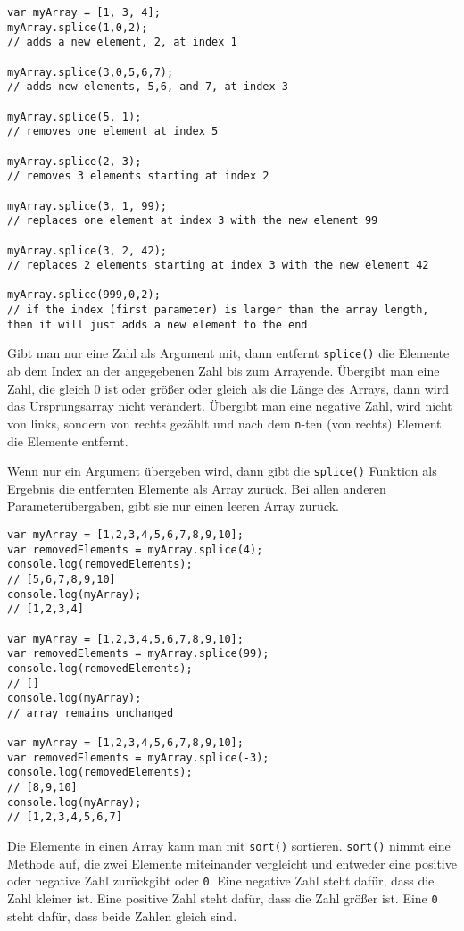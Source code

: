 \documentclass[babel]{book}
\begin{document}
\begin{lstlisting}[caption=Array Konstruktor]
var myArray = [1, 3, 4];
myArray.splice(1,0,2); 
// adds a new element, 2, at index 1

myArray.splice(3,0,5,6,7); 
// adds new elements, 5,6, and 7, at index 3

myArray.splice(5, 1); 
// removes one element at index 5

myArray.splice(2, 3); 
// removes 3 elements starting at index 2

myArray.splice(3, 1, 99); 
// replaces one element at index 3 with the new element 99

myArray.splice(3, 2, 42); 
// replaces 2 elements starting at index 3 with the new element 42

myArray.splice(999,0,2); 
// if the index (first parameter) is larger than the array length, then it will just adds a new element to the end

\end{lstlisting}

Gibt man nur eine Zahl als Argument mit, dann entfernt \lstinline|splice()| die Elemente ab dem Index an der angegebenen Zahl bis zum Arrayende. Übergibt man eine Zahl, die gleich 0 ist oder größer oder gleich als die Länge des Arrays, dann wird das Ursprungsarray nicht verändert. Übergibt man eine negative Zahl, wird nicht von links, sondern von rechts gezählt und nach dem \lstinline|n|-ten (von rechts) Element die Elemente entfernt.

Wenn nur ein Argument übergeben wird, dann gibt die \lstinline|splice()| Funktion als Ergebnis die entfernten Elemente als Array zurück. Bei allen anderen Parameterübergaben, gibt sie nur einen leeren Array zurück.

\begin{lstlisting}[caption=Array Konstruktor]
var myArray = [1,2,3,4,5,6,7,8,9,10];
var removedElements = myArray.splice(4);
console.log(removedElements);
// [5,6,7,8,9,10]
console.log(myArray);
// [1,2,3,4]

var myArray = [1,2,3,4,5,6,7,8,9,10];
var removedElements = myArray.splice(99);
console.log(removedElements);
// []
console.log(myArray);
// array remains unchanged

var myArray = [1,2,3,4,5,6,7,8,9,10];
var removedElements = myArray.splice(-3);
console.log(removedElements);
// [8,9,10]
console.log(myArray);
// [1,2,3,4,5,6,7]
\end{lstlisting}

Die Elemente in einen Array kann man mit \lstinline|sort()| sortieren. \lstinline|sort()| nimmt eine Methode auf, die zwei Elemente miteinander vergleicht und entweder eine positive oder negative Zahl zurückgibt oder \lstinline|0|. Eine negative Zahl steht dafür, dass die Zahl kleiner ist. Eine positive Zahl steht dafür, dass die Zahl größer ist. Eine \lstinline|0| steht dafür, dass beide Zahlen gleich sind.
\end{document}
